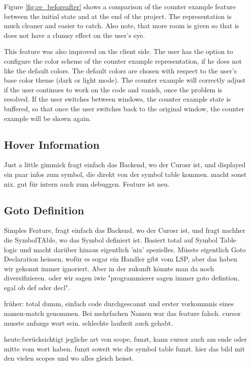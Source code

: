 Figure \ref{fig:ce_beforeafter} shows a comparison of the counter example feature between the initial state and at the end of the project.
The representation is much cleaner and easier to catch.
Also note, that more room is given so that is does not have a clumsy effect on the user's eye. 

This feature was also improved on the client side.
The user has the option to configure the color scheme of the counter example representation, if he does not like the default colors.
The default colors are chosen with respect to the user's base color theme (dark or light mode).
The counter example will correctly adjust if the user continues to work on the code and vanish, once the problem is resolved.
If the user switches between windows, the counter example state is buffered, so that once the user switches back to the original window, the counter example will be shown again.



\subsection{Hover Information}
Just a little gimmick
fragt einfach das Backend, wo der Curosr ist, und displayed ein paar infos zum symbol, die direkt von der symbol table kommen.
macht sonst nix.
gut für intern auch zum debuggen.
Feature ist neu.

\subsection{Goto Definition}
Simples Feature, fragt einfach das Backend, wo der Curosr ist, und fragt nachher die SymbolTAble, wo das Symbol definiert ist.
Basiert total auf Symbol Table logic und macht darüber hinaus eigentlich 'nix' spezielles.
Müsste eigentlich Goto Declaration heissen, wofür es sogar ein Handler gibt vom LSP, aber das haben wir gekonnt immer ignoriert. Aber in der zukunft könnte man da noch diversifizieren.
oder wir sagen iwie "programmierer sagen immer goto defintion, egal ob def oder decl".

früher: total dumm, einfach code durchgescannt und erster vorkommnis eines namen-match genommen. Bei mehrfachen Namen war das feature falsch. cursor musste anfangs wort sein.
schlechte laufzeit auch gehabt.

heute:berücksichtigt jegliche art von scope, funzt, kann cursor auch am ende oder mitte vom wort haben. funzt soweit wie die symbol table funzt.
hier das bild mit den vielen scopes und wo alles gleich heisst.


